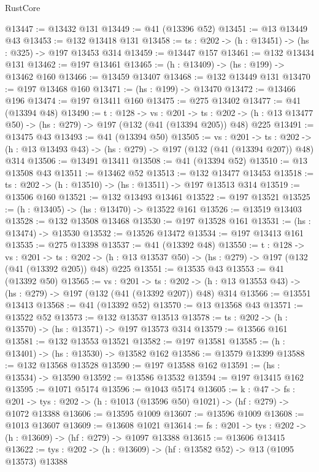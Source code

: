\begin{lexlean}{RustCore}
\begin{coremodule}
@13447 := @13432 @131
@13449 := @41 (@13396 @52)
@13451 := @13 @13449 @43
@13453 := @132 @13418 @131
@13458 := {ts : @202} -> (h : @13451) -> (hs : @325) -> @197 @13453 @314
@13459 := @13447 @157
@13461 := @132 @13434 @131
@13462 := @197 @13461
@13465 := (h : @13409) -> (hs : @199) -> @13462 @160
@13466 := @13459 @13407
@13468 := @132 @13449 @131
@13470 := @197 @13468 @160
@13471 := (hs : @199) -> @13470
@13472 := @13466 @196
@13474 := @197 @13411 @160
@13475 := @275 @13402
@13477 := @41 (@13394 @48)
@13490 := {t : @128} ->
  {vs : @201} ->
  {ts : @202} -> (h : @13 @13477 @50) -> (hs : @279) -> @197 (@132 (@41 (@13394 @205)) @48) @225
@13491 := @13475 @43
@13493 := @41 (@13394 @50)
@13505 := {vs : @201} ->
  {ts : @202} -> (h : @13 @13493 @43) -> (hs : @279) -> @197 (@132 (@41 (@13394 @207)) @48) @314
@13506 := @13491 @13411
@13508 := @41 (@13394 @52)
@13510 := @13 @13508 @43
@13511 := @13462 @52
@13513 := @132 @13477 @13453
@13518 := {ts : @202} -> (h : @13510) -> (hs : @13511) -> @197 @13513 @314
@13519 := @13506 @160
@13521 := @132 @13493 @13461
@13522 := @197 @13521
@13525 := (h : @13405) -> (hs : @13470) -> @13522 @161
@13526 := @13519 @13403
@13528 := @132 @13508 @13468
@13530 := @197 @13528 @161
@13531 := (hs : @13474) -> @13530
@13532 := @13526 @13472
@13534 := @197 @13413 @161
@13535 := @275 @13398
@13537 := @41 (@13392 @48)
@13550 := {t : @128} ->
  {vs : @201} ->
  {ts : @202} -> (h : @13 @13537 @50) -> (hs : @279) -> @197 (@132 (@41 (@13392 @205)) @48) @225
@13551 := @13535 @43
@13553 := @41 (@13392 @50)
@13565 := {vs : @201} ->
  {ts : @202} -> (h : @13 @13553 @43) -> (hs : @279) -> @197 (@132 (@41 (@13392 @207)) @48) @314
@13566 := @13551 @13413
@13568 := @41 (@13392 @52)
@13570 := @13 @13568 @43
@13571 := @13522 @52
@13573 := @132 @13537 @13513
@13578 := {ts : @202} -> (h : @13570) -> (hs : @13571) -> @197 @13573 @314
@13579 := @13566 @161
@13581 := @132 @13553 @13521
@13582 := @197 @13581
@13585 := (h : @13401) -> (hs : @13530) -> @13582 @162
@13586 := @13579 @13399
@13588 := @132 @13568 @13528
@13590 := @197 @13588 @162
@13591 := (hs : @13534) -> @13590
@13592 := @13586 @13532
@13594 := @197 @13415 @162
@13595 := @1071 @5174
@13596 := @1043 @5174
@13605 := {k : @47} ->
  {fs : @201} -> {tys : @202} -> (h : @1013 (@13596 @50) @1021) -> (hf : @279) -> @1072 @13388
@13606 := @13595 @1009
@13607 := @13596 @1009
@13608 := @1013 @13607
@13609 := @13608 @1021
@13614 := {fs : @201} -> {tys : @202} -> (h : @13609) -> (hf : @279) -> @1097 @13388
@13615 := @13606 @13415
@13622 := {tys : @202} -> (h : @13609) -> (hf : @13582 @52) -> @13 (@1095 @13573) @13388

\end{coremodule}
\end{lexlean}
